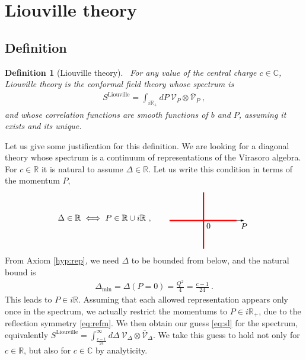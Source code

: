 \documentclass[12pt, a4paper]{article}
\theoremstyle{break}
\newtheorem{defn}[exo]{Definition}
\begin{document}
\section{Liouville theory}

\subsection{Definition}

\begin{defn}[Liouville theory]
 ~\label{def:liou}
 For any value of the central charge $c\in\mathbb{C}$, Liouville theory is the conformal field theory whose spectrum is 
 \begin{align}
  S^\mathrm{Liouville} 
= \int_{i\mathbb{R}_+}  dP\ \mathcal V_P \otimes 
   \bar{\mathcal V}_P\ , 
   \label{eq:sl}
 \end{align}
and whose correlation functions are smooth functions of $b$ and $P$, assuming it exists and its unique.
\end{defn}
Let us give some justification for this definition. We are looking for a diagonal theory whose spectrum is a continuum of representations of the Virasoro algebra. For $c\in \mathbb{R}$ it is natural to assume $\Delta\in \mathbb{R}$. Let us write this condition in terms of the momentum $P$,
\begin{align}
 \Delta \in \mathbb{R} \iff P\in \mathbb{R} \cup i\mathbb{R}\ ,
  \qquad
   \begin{tikzpicture}[scale = .4, baseline=(current  bounding  box.center)]
   \draw[-latex] (-1.6, 0)  -- (2, 0) node[below right] {$0$} -- (4, 0)  -- (6.3, 0) node[below] {$P$};
  \draw[red, ultra thick] (-1.6, 0) -- (5.5, 0);
  \draw[red, ultra thick] (2, -3) -- (2, 3);
 \end{tikzpicture}
\end{align}
From Axiom \ref{hyp:rep}, 
we need $\Delta$ to be bounded from below, and the natural bound is 
\begin{align}
 \Delta_\text{min}=\Delta\left(P=0\right) = \frac{Q^2}{4}=\frac{c-1}{24}\ .
\end{align}
This leads to $P \in i\mathbb{R}$. Assuming that each allowed representation appears only once in the spectrum, we actually restrict the momentums to $P \in i\mathbb{R}_+$, due to the reflection symmetry \eqref{eq:refm}.
We then obtain our guess \eqref{eq:sl} for the spectrum, equivalently $S^\mathrm{Liouville} 
= \int_{\frac{c-1}{24}}^\infty d\Delta\ \mathcal V_{\Delta}\otimes \bar{\mathcal{V}}_\Delta $.
We take this guess to hold not only for $c\in\mathbb{R}$, but also for $c\in\mathbb{C}$ by analyticity.
\end{document}
